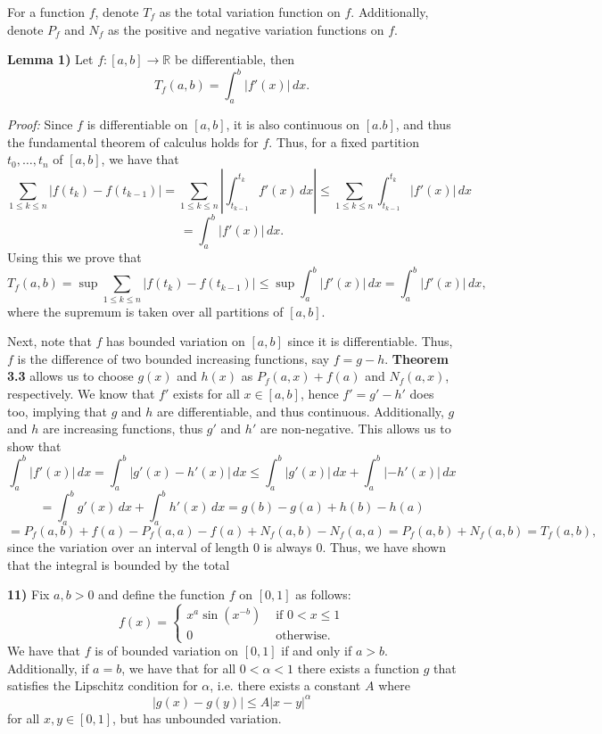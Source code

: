 \documentclass[12pt]{article}
\newcommand{\R}{\ensuremath{\mathbb{R}}}
\newcommand{\parenb}[1]{\left(#1\right)}
\newcommand{\vertb}[1]{\left\vert#1\right\vert}
\newcommand{\proof}{\textit{Proof: }}
\renewcommand{\t}[1]{\text{ #1 }}
\begin{document}
\pagestyle{fancy}

\setlength{\parindent}{0in}
\setlength{\parskip}{0.1in}

For a function \( f \), denote \( T_f \) as the total variation function on
\( f \).
Additionally, denote \( P_f \) and \( N_f \) as the positive and negative
variation functions on \( f \).

\textbf{Lemma 1)}
Let \( f : [a,b] \to \R \) be differentiable, then
\[
	T_f(a,b) = \int_a^b \vertb{f'(x)} \, dx.
\]

\proof
Since \( f \) is differentiable on \( [a,b] \), it is also continuous on
\( [a.b] \), and thus the fundamental theorem of calculus holds for \( f \).
Thus, for a fixed partition \( t_0, \dots, t_n \) of \( [a,b] \), we have that
\[
	\sum_{1 \leq k \leq n} \vertb{f(t_k) - f(t_{k - 1})}
	= \sum_{1 \leq k \leq n} \vertb{\int_{t_{k - 1}}^{t_k} f'(x) \, dx}
	\leq \sum_{1 \leq k \leq n} \int_{t_{k - 1}}^{t_k} \vertb{f'(x)} \, dx
\]
\[
	= \int_a^b \vertb{f'(x)} \, dx.
\]
Using this we prove that
\[
	T_f(a,b)
	= \sup \sum_{1 \leq k \leq n} \vertb{f(t_k) - f(t_{k - 1})}
	\leq \sup \int_a^b \vertb{f'(x)} \, dx
	= \int_a^b \vertb{f'(x)} \, dx,
\]
where the supremum is taken over all partitions of \( [a,b] \).

Next, note that \( f \) has bounded variation on \( [a,b] \) since it is
differentiable.
Thus, \( f \) is the difference of two bounded increasing functions, say
\( f = g - h \).
\textbf{Theorem 3.3} allows us to choose \( g(x) \) and \( h(x) \) as
\( P_f(a,x) + f(a) \) and \( N_f(a,x) \), respectively.
We know that \( f' \) exists for all \( x \in [a,b] \), hence
\( f' = g' - h' \) does too, implying that \( g \) and \( h \) are
differentiable, and thus continuous.
Additionally, \( g \) and \( h \) are increasing functions, thus \( g' \)
and \( h' \) are non-negative.
This allows us to show that
\[
	\int_a^b \vertb{f'(x)} \, dx
	= \int_a^b \vertb{g'(x) - h'(x)} \, dx
	\leq \int_a^b \vertb{g'(x)} \, dx + \int_a^b \vertb{-h'(x)} \, dx
\]
\[
	= \int_a^b g'(x) \, dx + \int_a^b h'(x) \, dx
	= g(b) - g(a) + h(b) - h(a)
\]
\[
	= P_f(a,b) + f(a) - P_f(a,a) - f(a) + N_f(a,b) - N_f(a,a)
	= P_f(a,b) + N_f(a,b)
	= T_f(a,b),
\]
since the variation over an interval of length 0 is always 0.
Thus, we have shown that the integral is bounded by the total

\textbf{11)}
Fix \( a, b > 0 \) and define the function \( f \) on \( [0,1] \) as follows:
\[
	f(x) = \begin{cases}
		x^a\sin\parenb{x^{-b}} & \t{if} 0 < x \leq 1 \\
		0                      & \t{otherwise.}
	\end{cases}
\]
We have that \( f \) is of bounded variation on \( [0,1] \) if and only if
\( a > b \).
Additionally, if \( a = b \), we have that for all \( 0 < \alpha < 1 \) there
exists a function \( g \) that satisfies the Lipschitz condition for
\( \alpha \), i.e. there exists a constant \( A \) where
\[
	\vertb{g(x) - g(y)} \leq A\vertb{x - y}^\alpha
\]
for all \( x, y \in [0,1] \), but has unbounded variation.
\end{document}
